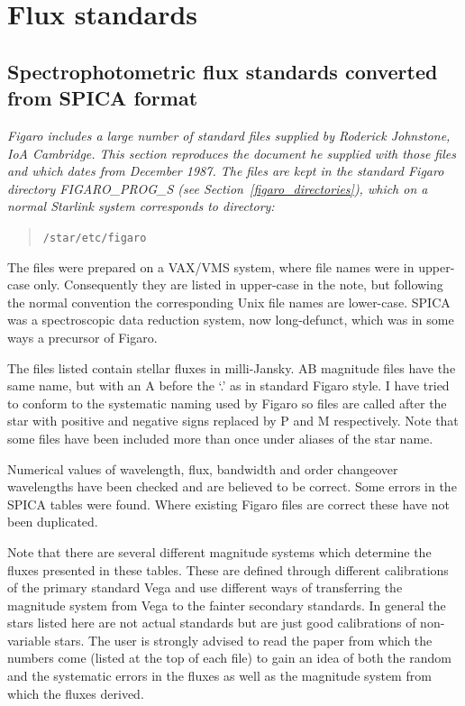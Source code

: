 \documentclass[11pt,twoside]{article}
\newcommand{\stardocinitials}  {SUN}
\newcommand{\stardocnumber}    {86.21}
\newcommand{\stardocname}{\stardocinitials /\stardocnumber}
\newcommand{\htmlref}[2]{#1}
\newcommand{\xlabel}[1]{}
\newcommand{\latorhtm}[2]{#1}
\newcommand{\latorhtm}[2]{#2}
\begin{document}
\newpage %
\section{\xlabel{flux_standards}Flux standards}
\markboth{Flux standards}{\stardocname}


\subsection{\label{standard1}Spectrophotometric flux standards converted from SPICA format}

{\em
   Figaro includes a large number of standard files supplied by Roderick
   Johnstone, IoA Cambridge.  This section reproduces the document he
   supplied with those files and which dates from December 1987.  The
   files are kept in the standard Figaro directory
\latorhtm{FIGARO\_PROG\_S (see Section~\ref{figaro_directories}),}
{\htmlref{FIGARO\_PROG\_S}{figaro_directories},}
   which on a normal Starlink system corresponds to directory:

  \begin{quote}
   {\tt /star/etc/figaro}
  \end{quote}

   The files were prepared on a VAX/VMS system, where file names were
   in upper-case only.  Consequently they are listed in upper-case in the
   note, but following the normal convention the corresponding Unix file
   names are lower-case.  SPICA was a spectroscopic data reduction system,
   now long-defunct, which was in some ways a precursor of Figaro.
\/}

   The files listed contain stellar fluxes in milli-Jansky. AB
   magnitude files have the same name, but with an A before the `.' as
   in standard Figaro style. I have tried to conform to the systematic
   naming used by Figaro so files are called after the star with
   positive and negative signs replaced by P and M respectively. Note
   that some files have been included more than once under aliases of
   the star name.

   Numerical values of wavelength, flux, bandwidth and order changeover
   wavelengths have been checked and are believed to be correct. Some
   errors in the SPICA tables were found. Where existing Figaro files
   are correct these have not been duplicated.

   Note that there are several different magnitude systems which
   determine the fluxes presented in these tables. These are defined
   through different calibrations of the primary standard Vega and use
   different ways of transferring the magnitude system from Vega to the
   fainter secondary standards. In general the stars listed here are not
   actual standards but are just good calibrations of non-variable
   stars. The user is strongly advised to read the paper from which the
   numbers come (listed at the top of each file) to gain an idea of both
   the random and the systematic errors in the fluxes as well as the
   magnitude system from which the fluxes derived.
\end{document}
